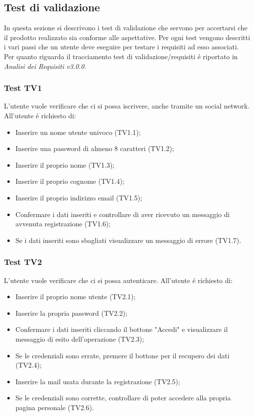 \subsection{Test di validazione}
In questa sezione si descrivono i test di validazione che servono per accertarsi che il prodotto realizzato sia conforme alle aspettative.
Per ogni test vengono descritti i vari passi che un utente deve eseguire per testare i requisiti ad esso associati. Per quanto riguarda il tracciamento test di validazione/requisiti é riportato in \textit{Analisi dei Requisiti v3.0.0}.

\subsubsection{Test TV1}
L'utente vuole verificare che ci si possa iscrivere, anche tramite un social network. \newline
All'utente é richiesto di:
\begin{itemize}
	\item Inserire un nome utente univoco (TV1.1);
	\item Inserire una password di almeno 8 caratteri (TV1.2);
	\item Inserire il proprio nome (TV1.3);
	\item Inserire il proprio cognome (TV1.4);
	\item Inserire il proprio indirizzo email (TV1.5);
	\item Confermare i dati inseriti e controllare di aver ricevuto un messaggio di avvenuta registrazione (TV1.6);
	\item Se i dati inseriti sono sbagliati visualizzare un messaggio di errore (TV1.7).
\end{itemize}

\subsubsection{Test TV2}
L'utente vuole verificare che ci si possa autenticare. \newline
All'utente é richiesto di:
\begin{itemize}
	\item Inserire il proprio nome utente (TV2.1);
	\item Inserire la propria password (TV2.2);
	\item Confermare i dati inseriti cliccando il bottone "Accedi" e visualizzare il messaggio di esito dell'operazione (TV2.3);
	\item Se le credenziali sono errate, premere il bottone per il recupero dei dati (TV2.4);
	\item Inserire la mail usata durante la registrazione (TV2.5);
	\item Se le credenziali sono corrette, controllare di poter accedere alla propria pagina personale (TV2.6).
\end{itemize}


